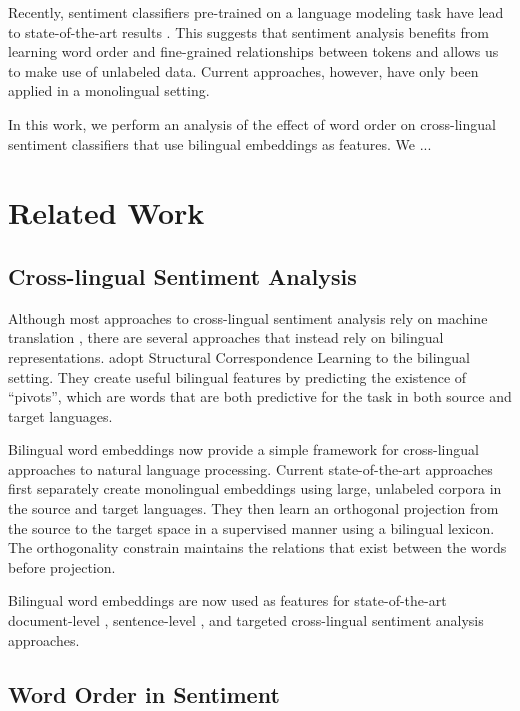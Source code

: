 \documentclass[11pt,a4paper]{article}
\begin{document}
Recently, sentiment classifiers pre-trained on a language modeling task have lead to state-of-the-art results \cite{Peters2018,Howard2018,Devlin2018}. This suggests that sentiment analysis benefits from learning word order and fine-grained relationships between tokens and allows us to make use of unlabeled data. Current approaches, however, have only been applied in a monolingual setting. 

In this work, we perform an analysis of the effect of word order on cross-lingual sentiment classifiers that use bilingual embeddings as features. We ...


\section{Related Work}

\subsection{Cross-lingual Sentiment Analysis}

Although most approaches to cross-lingual sentiment analysis rely on machine translation \cite{Banea2008,Balahur2014d,Klinger2015},
there are several approaches that instead rely on bilingual representations. 
 adopt Structural Correspondence Learning to the
bilingual setting. They create useful bilingual features by predicting the existence
of ``pivots'', which are words that are both predictive for the task in both source and target languages.

Bilingual word embeddings \cite{Kocisky2014,Chandar2014,Luong2015} now provide
a simple framework for cross-lingual approaches to natural language processing. 
Current state-of-the-art approaches \cite{Artetxe2017,Artetxe2018,Lample2017} first separately create monolingual embeddings using large, unlabeled corpora in the source and target languages. They then learn an orthogonal projection from the source to the target space in a supervised manner using a bilingual lexicon. The orthogonality constrain maintains the relations that exist between the words before projection.

Bilingual word embeddings are now used as features for state-of-the-art document-level \cite{Chen2016}, sentence-level \cite{Barnes2018b}, and targeted \cite{Hangya2018} cross-lingual sentiment analysis approaches.


\subsection{Word Order in Sentiment}
\end{document}

